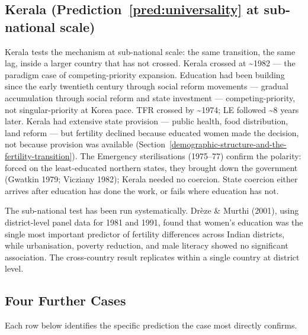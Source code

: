 \documentclass[12pt,letterpaper]{article}
\begin{document}
\subsection{Kerala (Prediction~\ref{pred:universality} at sub-national scale)}\label{kerala}

Kerala tests the mechanism at sub-national scale: the same transition,
the same lag, inside a larger country that has not crossed. Kerala
crossed at \textasciitilde1982 --- the paradigm case of
competing-priority expansion. Education had been building since the
early twentieth century through social reform movements --- gradual
accumulation through social reform and state investment ---
competing-priority, not singular-priority at Korea pace. TFR
crossed by \textasciitilde1974; LE followed \textasciitilde8 years
later. Kerala had extensive state provision --- public health, food
distribution, land reform --- but fertility declined because educated
women made the decision, not because provision was available
(Section~\ref{demographic-structure-and-the-fertility-transition}). The
Emergency sterilisations (1975--77) confirm the polarity: forced on
the least-educated northern states, they brought down the government
(Gwatkin 1979; Vicziany 1982); Kerala needed no coercion. State
coercion either arrives after education has done the work, or fails
where education has not.

The sub-national test has been run systematically. Drèze \& Murthi
(2001), using district-level panel data for 1981 and 1991, found that
women's education was the single most important predictor of fertility
differences across Indian districts, while urbanisation, poverty
reduction, and male literacy showed no significant association. The
cross-country result replicates within a single country at district
level.

\subsection{Four Further Cases}\label{four-further-cases}

Each row below identifies the specific prediction the case most
directly confirms.
\end{document}
